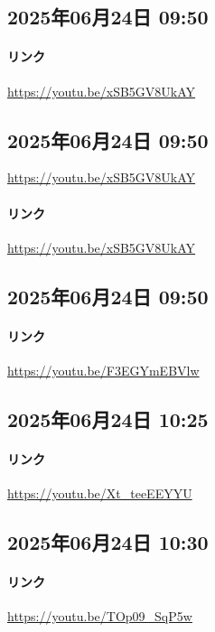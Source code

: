 \subsection*{2025年06月24日 09:50}

\paragraph{リンク}
\url{https://youtu.be/xSB5GV8UkAY}

\subsection*{2025年06月24日 09:50}

\url{https://youtu.be/xSB5GV8UkAY}

\paragraph{リンク}
\url{https://youtu.be/xSB5GV8UkAY}

\subsection*{2025年06月24日 09:50}

\paragraph{リンク}
\url{https://youtu.be/F3EGYmEBVlw}

\subsection*{2025年06月24日 10:25}

\paragraph{リンク}
\url{https://youtu.be/Xt_teeEEYYU}

\subsection*{2025年06月24日 10:30}

\paragraph{リンク}
\url{https://youtu.be/TOp09_SqP5w}

